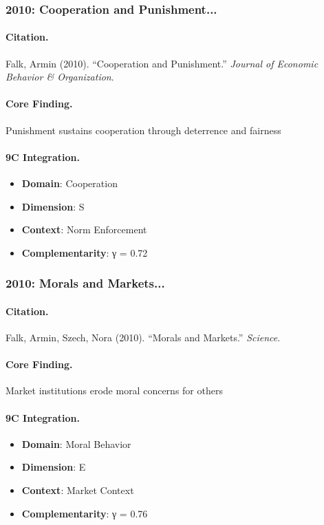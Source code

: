 \subsubsection{2010: Cooperation and Punishment...}

\paragraph{Citation.}
Falk, Armin (2010). ``Cooperation and Punishment.''
\textit{Journal of Economic Behavior & Organization}.

\paragraph{Core Finding.}
Punishment sustains cooperation through deterrence and fairness

\paragraph{9C Integration.}
\begin{itemize}[nosep]
  \item \textbf{Domain}: Cooperation
  \item \textbf{Dimension}: S
  \item \textbf{Context}: Norm Enforcement
  \item \textbf{Complementarity}: γ = 0.72
\end{itemize}


\subsubsection{2010: Morals and Markets...}

\paragraph{Citation.}
Falk, Armin, Szech, Nora (2010). ``Morals and Markets.''
\textit{Science}.

\paragraph{Core Finding.}
Market institutions erode moral concerns for others

\paragraph{9C Integration.}
\begin{itemize}[nosep]
  \item \textbf{Domain}: Moral Behavior
  \item \textbf{Dimension}: E
  \item \textbf{Context}: Market Context
  \item \textbf{Complementarity}: γ = 0.76
\end{itemize}


